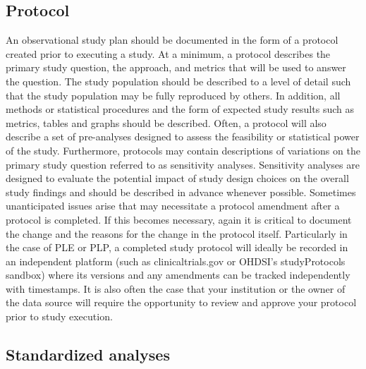 \documentclass[11pt]{book}
\theoremstyle{definition}
\theoremstyle{definition}
\theoremstyle{definition}
\theoremstyle{remark}
\begin{document}
\hypertarget{protocol}{%
\subsection{Protocol}\label{protocol}}

An observational study plan should be documented in the form of a protocol created prior to executing a study. At a minimum, a protocol describes the primary study question, the approach, and metrics that will be used to answer the question. The study population should be described to a level of detail such that the study population may be fully reproduced by others. In addition, all methods or statistical procedures and the form of expected study results such as metrics, tables and graphs should be described.
Often, a protocol will also describe a set of pre-analyses designed to assess the feasibility or statistical power of the study. Furthermore, protocols may contain descriptions of variations on the primary study question referred to as sensitivity analyses. Sensitivity analyses are designed to evaluate the potential impact of study design choices on the overall study findings and should be described in advance whenever possible. Sometimes unanticipated issues arise that may necessitate a protocol amendment after a protocol is completed. If this becomes necessary, again it is critical to document the change and the reasons for the change in the protocol itself. Particularly in the case of PLE or PLP, a completed study protocol will ideally be recorded in an independent platform (such as clinicaltrials.gov or OHDSI's studyProtocols sandbox) where its versions and any amendments can be tracked independently with timestamps. It is also often the case that your institution or the owner of the data source will require the opportunity to review and approve your protocol prior to study execution.

\hypertarget{standardized-analyses}{%
\subsection{Standardized analyses}\label{standardized-analyses}}
\end{document}
